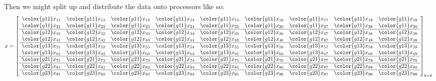 Then we might split up and distribute the data onto processors like so:
\begin{align*}
x &= \left[
      \begin{array}{lllllllll}
      \color{g11}x_{11} & \color{g11}x_{12} & \color{g11}x_{13} & \color{g11}x_{14} & \color{g11}x_{15} & \color{g11}x_{16} & \color{g11}x_{17} & \color{g11}x_{18} & \color{g11}x_{19}\\
      \color{g11}x_{21} & \color{g11}x_{22} & \color{g11}x_{23} & \color{g11}x_{24} & \color{g11}x_{25} & \color{g11}x_{26} & \color{g11}x_{27} & \color{g11}x_{28} & \color{g11}x_{29}\\\hline
      \color{g12}x_{31} & \color{g12}x_{32} & \color{g12}x_{33} & \color{g12}x_{34} & \color{g12}x_{35} & \color{g12}x_{36} & \color{g12}x_{37} & \color{g12}x_{38} & \color{g12}x_{39}\\
      \color{g12}x_{41} & \color{g12}x_{42} & \color{g12}x_{43} & \color{g12}x_{44} & \color{g12}x_{45} & \color{g12}x_{46} & \color{g12}x_{47} & \color{g12}x_{48} & \color{g12}x_{49}\\\hline
      \color{g13}x_{51} & \color{g13}x_{52} & \color{g13}x_{53} & \color{g13}x_{54} & \color{g13}x_{55} & \color{g13}x_{56} & \color{g13}x_{57} & \color{g13}x_{58} & \color{g13}x_{59}\\
      \color{g13}x_{61} & \color{g13}x_{62} & \color{g13}x_{63} & \color{g13}x_{64} & \color{g13}x_{65} & \color{g13}x_{66} & \color{g13}x_{67} & \color{g13}x_{68} & \color{g13}x_{69}\\\hline
      \color{g21}x_{71} & \color{g21}x_{72} & \color{g21}x_{73} & \color{g21}x_{74} & \color{g21}x_{75} & \color{g21}x_{76} & \color{g21}x_{77} & \color{g21}x_{78} & \color{g21}x_{79}\\\hline
      \color{g22}x_{81} & \color{g22}x_{82} & \color{g22}x_{83} & \color{g22}x_{84} & \color{g22}x_{85} & \color{g22}x_{86} & \color{g22}x_{87} & \color{g22}x_{88} & \color{g22}x_{89}\\\hline
      \color{g23}x_{91} & \color{g23}x_{92} & \color{g23}x_{93} & \color{g23}x_{94} & \color{g23}x_{95} & \color{g23}x_{96} & \color{g23}x_{97} & \color{g23}x_{98} & \color{g23}x_{99}\\
      \end{array}
\right]_{9\times 9}
\end{align*}

